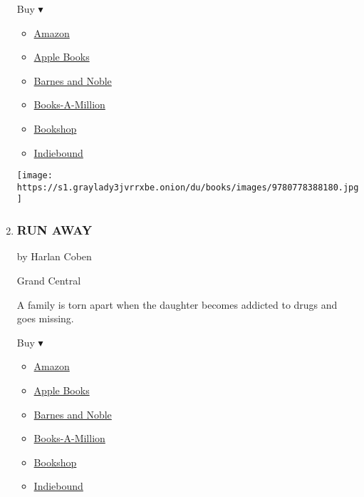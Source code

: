 \begin{enumerate}
  Buy ▾

  \begin{itemize}
  \tightlist
  \item
    \href{https://www.amazon.com/dp/0778388182?tag=NYTBSREV-20\&tag=NYTBS-20}{Amazon}
  \item
    \href{https://du-gae-books-dot-nyt-du-prd.appspot.com/buy?title=THE+YANKEE+WIDOW\&author=Linda+Lael+Miller}{Apple
    Books}
  \item
    \href{https://www.anrdoezrs.net/click-7990613-11819508?url=https\%3A\%2F\%2Fwww.barnesandnoble.com\%2Fw\%2F\%3Fean\%3D9780778388180}{Barnes
    and Noble}
  \item
    \href{https://www.anrdoezrs.net/click-7990613-35140?url=https\%3A\%2F\%2Fwww.booksamillion.com\%2Fp\%2FTHE\%2BYANKEE\%2BWIDOW\%2FLinda\%2BLael\%2BMiller\%2F9780778388180}{Books-A-Million}
  \item
    \href{https://bookshop.org/a/3546/9780778388180}{Bookshop}
  \item
    \href{https://www.indiebound.org/book/9780778388180?aff=NYT}{Indiebound}
  \end{itemize}

  \texttt{[image: https://s1.graylady3jvrrxbe.onion/du/books/images/9780778388180.jpg]}
\item
  \hypertarget{run-away}{%
  \subsubsection{RUN AWAY}\label{run-away}}

  by Harlan Coben

  Grand Central

  A family is torn apart when the daughter becomes addicted to drugs and
  goes missing.

  Buy ▾

  \begin{itemize}
  \tightlist
  \item
    \href{https://www.amazon.com/Run-Away-Harlan-Coben/dp/1538748460?tag=NYTBS-20}{Amazon}
  \item
    \href{https://du-gae-books-dot-nyt-du-prd.appspot.com/buy?title=RUN+AWAY\&author=Harlan+Coben}{Apple
    Books}
  \item
    \href{https://www.anrdoezrs.net/click-7990613-11819508?url=https\%3A\%2F\%2Fwww.barnesandnoble.com\%2Fw\%2F\%3Fean\%3D9781538748428}{Barnes
    and Noble}
  \item
    \href{https://www.anrdoezrs.net/click-7990613-35140?url=https\%3A\%2F\%2Fwww.booksamillion.com\%2Fp\%2FRUN\%2BAWAY\%2FHarlan\%2BCoben\%2F9781538748428}{Books-A-Million}
  \item
    \href{https://bookshop.org/a/3546/9781538748428}{Bookshop}
  \item
    \href{https://www.indiebound.org/book/9781538748428?aff=NYT}{Indiebound}
  \end{itemize}


\end{enumerate}
